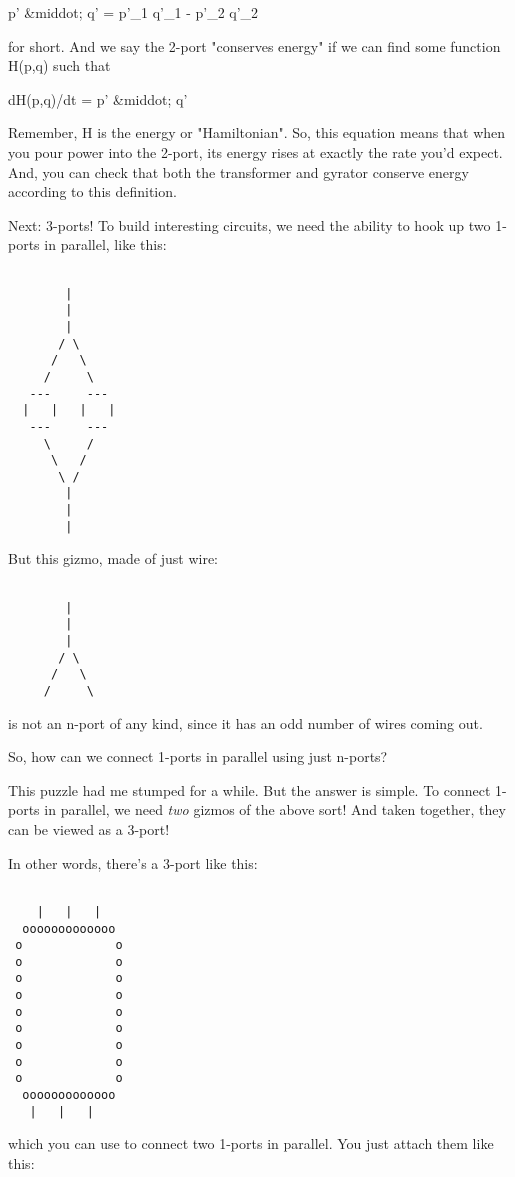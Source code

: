 p' &middot; q' = p'_{1} q'_{1} - p'_{2} q'_{2}

for short.  And we say the 2-port "conserves energy" if we can find 
some function H(p,q) such that

dH(p,q)/dt = p' &middot; q'

Remember, H is the energy or "Hamiltonian".  So, this equation means
that when you pour power into the 2-port, its energy rises at exactly
the rate you'd expect.  And, you can check that both the transformer
and gyrator conserve energy according to this definition.

Next: 3-ports!  To build interesting circuits, we need the ability to
hook up two 1-ports in parallel, like this:


\begin{verbatim}

        |
        |
        |
       / \
      /   \
     /     \
   ---     ---
  |   |   |   |
   ---     ---
     \     /
      \   /
       \ /
        |
        |
        |
\end{verbatim}
    
But this gizmo, made of just wire:


\begin{verbatim}

        |
        |
        |
       / \
      /   \
     /     \

\end{verbatim}
    
is not an n-port of any kind, since it has an odd number of wires
coming out.

So, how can we connect 1-ports in parallel using just n-ports?

This puzzle had me stumped for a while.  But the answer is simple.  To
connect 1-ports in parallel, we need \emph{two} gizmos of the above
sort!  And taken together, they can be viewed as a 3-port!

In other words, there's a 3-port like this:


\begin{verbatim}

    |   |   |
  ooooooooooooo
 o             o
 o             o
 o             o
 o             o
 o             o
 o             o
 o             o
 o             o
 o             o
  ooooooooooooo
   |   |   |
\end{verbatim}
    

which you can use to connect two 1-ports in parallel.  You just attach
them like this:


